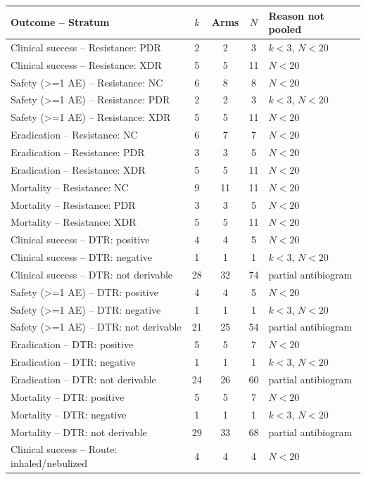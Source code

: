 \begin{tabular}{lcccl}
\toprule
Outcome -- Stratum & $k$ & Arms & $N$ & Reason not pooled \\
\midrule
Clinical success -- Resistance: PDR & 2 & 2 & 3 & $k<3$, $N<20$ \\
Clinical success -- Resistance: XDR & 5 & 5 & 11 & $N<20$ \\
Safety (>=1 AE) -- Resistance: NC & 6 & 8 & 8 & $N<20$ \\
Safety (>=1 AE) -- Resistance: PDR & 2 & 2 & 3 & $k<3$, $N<20$ \\
Safety (>=1 AE) -- Resistance: XDR & 5 & 5 & 11 & $N<20$ \\
Eradication -- Resistance: NC & 6 & 7 & 7 & $N<20$ \\
Eradication -- Resistance: PDR & 3 & 3 & 5 & $N<20$ \\
Eradication -- Resistance: XDR & 5 & 5 & 11 & $N<20$ \\
Mortality -- Resistance: NC & 9 & 11 & 11 & $N<20$ \\
Mortality -- Resistance: PDR & 3 & 3 & 5 & $N<20$ \\
Mortality -- Resistance: XDR & 5 & 5 & 11 & $N<20$ \\
Clinical success -- DTR: positive & 4 & 4 & 5 & $N<20$ \\
Clinical success -- DTR: negative & 1 & 1 & 1 & $k<3$, $N<20$ \\
Clinical success -- DTR: not derivable & 28 & 32 & 74 & partial antibiogram \\
Safety (>=1 AE) -- DTR: positive & 4 & 4 & 5 & $N<20$ \\
Safety (>=1 AE) -- DTR: negative & 1 & 1 & 1 & $k<3$, $N<20$ \\
Safety (>=1 AE) -- DTR: not derivable & 21 & 25 & 54 & partial antibiogram \\
Eradication -- DTR: positive & 5 & 5 & 7 & $N<20$ \\
Eradication -- DTR: negative & 1 & 1 & 1 & $k<3$, $N<20$ \\
Eradication -- DTR: not derivable & 24 & 26 & 60 & partial antibiogram \\
Mortality -- DTR: positive & 5 & 5 & 7 & $N<20$ \\
Mortality -- DTR: negative & 1 & 1 & 1 & $k<3$, $N<20$ \\
Mortality -- DTR: not derivable & 29 & 33 & 68 & partial antibiogram \\
Clinical success -- Route: inhaled/nebulized & 4 & 4 & 4 & $N<20$ \\

\end{tabular}
